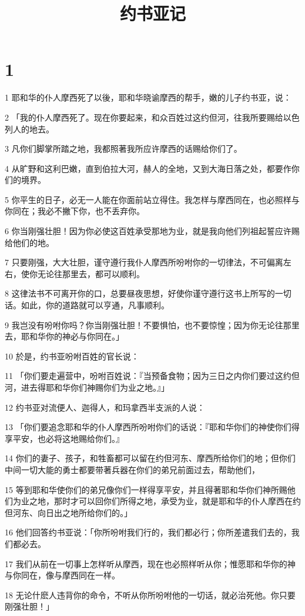 

\title{约书亚记}


\chapter{1}

\par 1 耶和华的仆人摩西死了以後，耶和华晓谕摩西的帮手，嫩的儿子约书亚，说：
\par 2 「我的仆人摩西死了。现在你要起来，和众百姓过这约但河，往我所要赐给以色列人的地去。
\par 3 凡你们脚掌所踏之地，我都照著我所应许摩西的话赐给你们了。
\par 4 从旷野和这利巴嫩，直到伯拉大河，赫人的全地，又到大海日落之处，都要作你们的境界。
\par 5 你平生的日子，必无一人能在你面前站立得住。我怎样与摩西同在，也必照样与你同在；我必不撇下你，也不丢弃你。
\par 6 你当刚强壮胆！因为你必使这百姓承受那地为业，就是我向他们列祖起誓应许赐给他们的地。
\par 7 只要刚强，大大壮胆，谨守遵行我仆人摩西所吩咐你的一切律法，不可偏离左右，使你无论往那里去，都可以顺利。
\par 8 这律法书不可离开你的口，总要昼夜思想，好使你谨守遵行这书上所写的一切话。如此，你的道路就可以亨通，凡事顺利。
\par 9 我岂没有吩咐你吗？你当刚强壮胆！不要惧怕，也不要惊惶；因为你无论往那里去，耶和华你的神必与你同在。」
\par 10 於是，约书亚吩咐百姓的官长说：
\par 11 「你们要走遍营中，吩咐百姓说：『当预备食物；因为三日之内你们要过这约但河，进去得耶和华你们神赐你们为业之地。』」
\par 12 约书亚对流便人、迦得人，和玛拿西半支派的人说：
\par 13 「你们要追念耶和华的仆人摩西所吩咐你们的话说：『耶和华你们的神使你们得享平安，也必将这地赐给你们。』
\par 14 你们的妻子、孩子，和牲畜都可以留在约但河东、摩西所给你们的地；但你们中间一切大能的勇士都要带著兵器在你们的弟兄前面过去，帮助他们，
\par 15 等到耶和华使你们的弟兄像你们一样得享平安，并且得著耶和华你们神所赐他们为业之地，那时才可以回你们所得之地，承受为业，就是耶和华的仆人摩西在约但河东、向日出之地所给你们的。」
\par 16 他们回答约书亚说：「你所吩咐我们行的，我们都必行；你所差遣我们去的，我们都必去。
\par 17 我们从前在一切事上怎样听从摩西，现在也必照样听从你；惟愿耶和华你的神与你同在，像与摩西同在一样。
\par 18 无论什麽人违背你的命令，不听从你所吩咐他的一切话，就必治死他。你只要刚强壮胆！」

